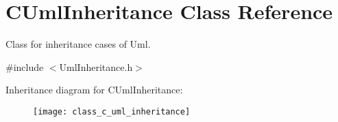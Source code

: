 \hypertarget{class_c_uml_inheritance}{}\section{C\+Uml\+Inheritance Class Reference}
\label{class_c_uml_inheritance}


Class for inheritance cases of Uml.  




{\ttfamily \#include $<$Uml\+Inheritance.\+h$>$}

Inheritance diagram for C\+Uml\+Inheritance\+:\begin{figure}[H]
\begin{center}
\leavevmode
\texttt{[image: class\_c\_uml\_inheritance]}
\end{center}
\end{figure}
